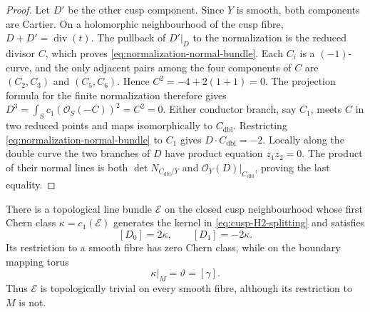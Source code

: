 \begin{proof}
Let $D'$ be the other cusp component.  Since $Y$ is smooth, both
components are Cartier.  On a holomorphic neighbourhood of the cusp fibre,
$D+D'=\operatorname{div}(t)$.  The pullback of $D'|_D$ to the
normalization is the reduced divisor $C$, which proves
\eqref{eq:normalization-normal-bundle}.  Each $C_i$ is a $(-1)$-curve,
and the only adjacent pairs among the four components of $C$ are
$(C_2,C_3)$ and $(C_5,C_6)$.  Hence
$C^2=-4+2(1+1)=0$.  The projection formula for the finite normalization
therefore gives
$D^3=\int_S c_1(\mathcal O_S(-C))^2=C^2=0$.
Either conductor branch, say $C_1$, meets $C$ in two reduced points and
maps isomorphically to $C_{\mathrm{dbl}}$.  Restricting
\eqref{eq:normalization-normal-bundle} to $C_1$ gives
$D\cdot C_{\mathrm{dbl}}=-2$.  Locally along the double curve the two
branches of $D$ have product equation $z_1z_2=0$.  The product of their
normal lines is both $\det N_{C_{\mathrm{dbl}}/Y}$ and
$\mathcal O_Y(D)|_{C_{\mathrm{dbl}}}$, proving the last equality.
\end{proof}

\begin{proposition}
\label{prop:cusp-component-class}
There is a topological line bundle $\mathcal E$ on the closed cusp neighbourhood
whose first Chern class $\kappa=c_1(\mathcal E)$ generates the kernel in
\eqref{eq:cusp-H2-splitting} and satisfies
\begin{equation}\label{eq:cusp-component-class}
 [D_0]=2\kappa,\qquad [D_1]=-2\kappa.
\end{equation}
Its restriction to a smooth fibre has zero Chern class, while on the boundary
mapping torus
\begin{equation}\label{eq:kappa-boundary}
 \kappa|_M=\vartheta=[\gamma].
\end{equation}
Thus $\mathcal E$ is topologically trivial on every smooth fibre, although
its restriction to $M$ is not.
\end{proposition}

